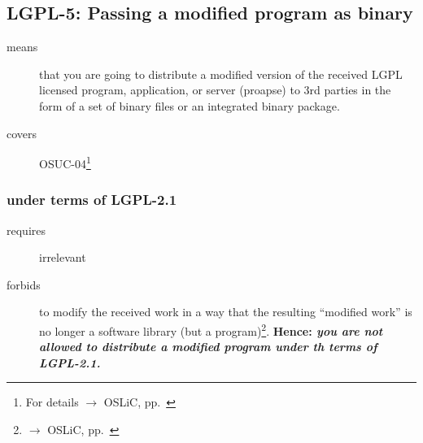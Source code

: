 \subsection{LGPL-5: Passing a modified program as binary}

\begin{description}
\item[means] that you are going to distribute a modified version of the received
LGPL licensed pro\-gram, application, or server (proapse) to 3rd parties in
the form of a set of binary files or an integrated binary package.
\item[covers] OSUC-04\footnote{For details $\rightarrow$ OSLiC, pp.\ \pageref{OSUC-04-DEF}}
\end{description}

\subsubsection{under terms of LGPL-2.1}

\begin{description}
  \item[requires] irrelevant
  \item[forbids] to modify the received work in a way that the resulting
  \enquote{modified work} is no longer a software library (but a
  program)\footnote{$\rightarrow$ OSLiC, pp.\ \pageref{}}. \textbf{Hence:
  \emph{you are not allowed to distribute a modified program under th terms of
  LGPL-2.1.}}
\end{description}

